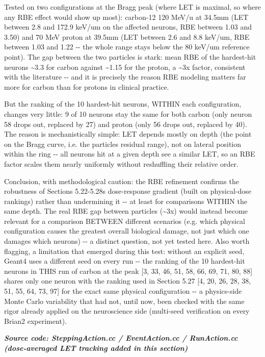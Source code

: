 \documentclass[
  english,
]{article}
\begin{document}
Tested on two configurations at the Bragg peak (where LET is maximal, so where any RBE effect would show up most): carbon-12 120 MeV/u at 34.5mm (LET between 2.8 and 172.9 keV/um on the affected neurons, RBE between 1.03 and 3.50) and 70 MeV proton at 39.5mm (LET between 2.6 and 8.8 keV/um, RBE between 1.03 and 1.22 -\/- the whole range stays below the 80 keV/um reference point). The gap between the two particles is stark: mean RBE of the hardest-hit neurons \textasciitilde3.3 for carbon against \textasciitilde1.15 for the proton, a \textasciitilde3x factor, consistent with the literature -\/- and it is precisely the reason RBE modeling matters far more for carbon than for protons in clinical practice.

But the ranking of the 10 hardest-hit neurons, WITHIN each configuration, changes very little: 9 of 10 neurons stay the same for both carbon (only neuron 58 drops out, replaced by 27) and proton (only 56 drops out, replaced by 40). The reason is mechanistically simple: LET depends mostly on depth (the point on the Bragg curve, i.e. the particle\textquotesingle s residual range), not on lateral position within the ring -\/- all neurons hit at a given depth see a similar LET, so an RBE factor scales them nearly uniformly without reshuffling their relative order.

Conclusion, with methodological caution: the RBE refinement confirms the robustness of Sections 5.22-5.28\textquotesingle s dose-response gradient (built on physical-dose rankings) rather than undermining it -\/- at least for comparisons WITHIN the same depth. The real RBE gap between particles (\textasciitilde3x) would instead become relevant for a comparison BETWEEN different scenarios (e.g. which physical configuration causes the greatest overall biological damage, not just which one damages which neurons) -\/- a distinct question, not yet tested here. Also worth flagging, a limitation that emerged during this test: without an explicit seed, Geant4 uses a different seed on every run -\/- the ranking of the 10 hardest-hit neurons in THIS run of carbon at the peak {[}3, 33, 46, 51, 58, 66, 69, 71, 80, 88{]} shares only one neuron with the ranking used in Section 5.27 {[}4, 20, 26, 28, 38, 51, 55, 64, 73, 97{]} for the exact same physical configuration -\/- a physics-side Monte Carlo variability that had not, until now, been checked with the same rigor already applied on the neuroscience side (multi-seed verification on every Brian2 experiment).

\textit{\textbf{Source code: SteppingAction.cc / EventAction.cc / RunAction.cc (dose-averaged LET tracking added in this section)}}
\end{document}
